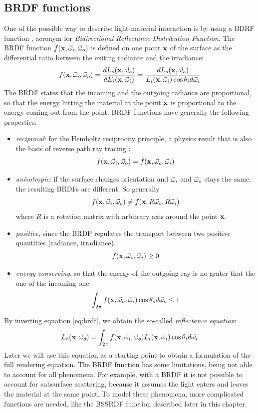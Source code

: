 \subsection{BRDF functions}
\label{sec:brdf}
One of the possible way to describe light-material interaction is by using a BDRF function \citep{Nicodemus:1992:GCN:136913.136929}, acronym for \emph{Bidirectional Reflectance Distribution Function}. The BRDF function $f(\mathbf{x}, \vec{\omega}_i, \vec{\omega}_o)$ is defined on one point $\mathbf{x}$ of the surface as the differential ratio between the exiting radiance and the irradiance:
\begin{equation}
f(\mathbf{x}, \vec{\omega}_i, \vec{\omega}_o) = \frac{d L_o(\mathbf{x}, \vec{\omega}_o)}{d E_i(\mathbf{x}, \vec{\omega}_i)} = \frac{d L_o(\mathbf{x}, \vec{\omega}_o)}{L_i(\mathbf{x}, \vec{\omega}_i) \cos\theta_i d \vec{\omega}_i}
\label{eq:brdf}
\end{equation}
The BRDF states that the incoming and the outgoing radiance are proportional, so that the energy hitting the material at the point $\mathbf{x}$ is proportional to the energy coming out from the point. BRDF functions have generally the following properties:
\begin{itemize}
	\item \emph{reciprocal}: for the Hemholtz reciprocity principle, a physics result that is also the basis of reverse path ray tracing \citep{Desolneux:2007:GTI:1557413}:
	$$
	f(\mathbf{x}, \vec{\omega}_i, \vec{\omega}_o) = f(\mathbf{x}, \vec{\omega}_o, \vec{\omega}_i)
	$$
	\item \emph{anisotropic}: if the surface changes orientation and $\vec{\omega}_i$ and $\vec{\omega}_o$ stays the same, the resulting BRDFs are different. So generally
	$$
	f(\mathbf{x}, \vec{\omega}_i, \vec{\omega}_o) \neq f(\mathbf{x}, R \vec{\omega}_o, R \vec{\omega}_i)
	$$
	where $R$ is a rotation matrix with arbitrary axis around the point $\mathbf{x}$.
	\item \emph{positive}, since the BRDF regulates the transport between two positive quantities (radiance, irradiance). 
	$$
	f(\mathbf{x}, \vec{\omega}_o, \vec{\omega}_i) \ge 0
	$$
	\item \emph{energy conserving}, so that the energy of the outgoing ray is no grater that the one of the incoming one 
	$$
	\int_{2\pi}  f(\mathbf{x}, \vec{\omega}_o, \vec{\omega}_i) \cos\theta_o d\vec{\omega}_o \le 1
	$$
\end{itemize}

By inverting equation \ref{eq:brdf}, we obtain the so-called \emph{reflectance equation}:
$$
L_o(\mathbf{x}, \vec{\omega}_o) = \int_{2\pi} f(\mathbf{x}, \vec{\omega}_i, \vec{\omega}_o) L_i(\mathbf{x}, \vec{\omega}_i) \cos\theta_i d\vec{\omega}_i
$$
Later we will use this equation as a starting point to obtain a formulation of the full rendering equation. The BRDF function has some limitations, being not able to account for all phenomena. For example, with a BRDF it is not possible to account for subsurface scattering, because it assumes the light enters and leaves the material at the same point. To model these phenomena, more complicated functions are needed, like the BSSRDF function described later in this chapter. 

